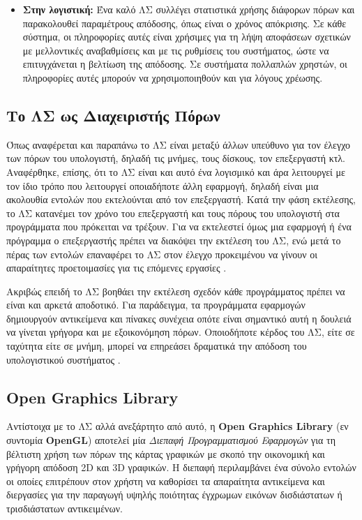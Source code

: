 \begin{itemize}
	\item \textbf{Στην λογιστική:} Ένα καλό ΛΣ συλλέγει στατιστικά χρήσης διάφορων πόρων και παρακολουθεί παραμέτρους απόδοσης, όπως είναι ο χρόνος απόκρισης. Σε κάθε σύστημα, οι πληροφορίες αυτές είναι χρήσιμες για τη λήψη αποφάσεων σχετικών με μελλοντικές αναβαθμίσεις και με τις ρυθμίσεις του συστήματος, ώστε να επιτυγχάνεται η βελτίωση της απόδοσης. Σε συστήματα πολλαπλών χρηστών, οι πληροφορίες αυτές μπορούν να χρησιμοποιηθούν και για λόγους χρέωσης.
\end{itemize}
\subsection{Το ΛΣ ως Διαχειριστής Πόρων}
Όπως αναφέρεται και παραπάνω το ΛΣ είναι μεταξύ άλλων υπεύθυνο για τον έλεγχο των πόρων του υπολογιστή, δηλαδή τις μνήμες, τους δίσκους, τον επεξεργαστή κτλ. Αναφέρθηκε, επίσης, ότι το ΛΣ είναι και αυτό ένα λογισμικό και άρα λειτουργεί με τον ίδιο τρόπο που λειτουργεί οποιαδήποτε άλλη εφαρμογή, δηλαδή είναι μια ακολουθία εντολών που εκτελούνται από τον επεξεργαστή. Κατά την φάση εκτέλεσης, το ΛΣ κατανέμει τον χρόνο του επεξεργαστή και τους πόρους του υπολογιστή στα προγράμματα που πρόκειται να τρέξουν. Για να εκτελεστεί όμως μια εφαρμογή ή ένα πρόγραμμα ο επεξεργαστής πρέπει να διακόψει την εκτέλεση του ΛΣ, ενώ μετά το πέρας των εντολών επαναφέρει το ΛΣ στον έλεγχο προκειμένου να γίνουν οι απαραίτητες προετοιμασίες για τις επόμενες εργασίες \cite{stallings}.

Ακριβώς επειδή το ΛΣ βοηθάει την εκτέλεση σχεδόν κάθε προγράμματος πρέπει να είναι και αρκετά αποδοτικό. Για παράδειγμα, τα προγράμματα εφαρμογών δημιουργούν αντικείμενα και πίνακες συνέχεια οπότε είναι σημαντικό αυτή η δουλειά να γίνεται γρήγορα και με εξοικονόμηση πόρων. Οποιοδήποτε κέρδος του ΛΣ, είτε σε ταχύτητα είτε σε μνήμη, μπορεί να επηρεάσει δραματικά την απόδοση του υπολογιστικού συστήματος \cite{elements_of_computing}.

\subsection{Open Graphics Library}
\label{sec:ogl}

Αντίστοιχα με το ΛΣ αλλά ανεξάρτητο από αυτό, η \textbf{Open Graphics Library}\cite{opengl_specification} (εν συντομία \textbf{OpenGL}) αποτελεί μία \textsl{Διεπαφή Προγραμματισμού Εφαρμογών} για τη βέλτιστη χρήση των πόρων της κάρτας γραφικών με σκοπό την οικονομική και γρήγορη απόδοση 2D και 3D γραφικών. Η διεπαφή περιλαμβάνει ένα σύνολο εντολών οι οποίες επιτρέπουν στον χρήστη να καθορίσει τα απαραίτητα αντικείμενα και διεργασίες για την παραγωγή υψηλής ποιότητας έγχρωμων εικόνων δισδιάστατων ή τρισδιάστατων αντικειμένων.

